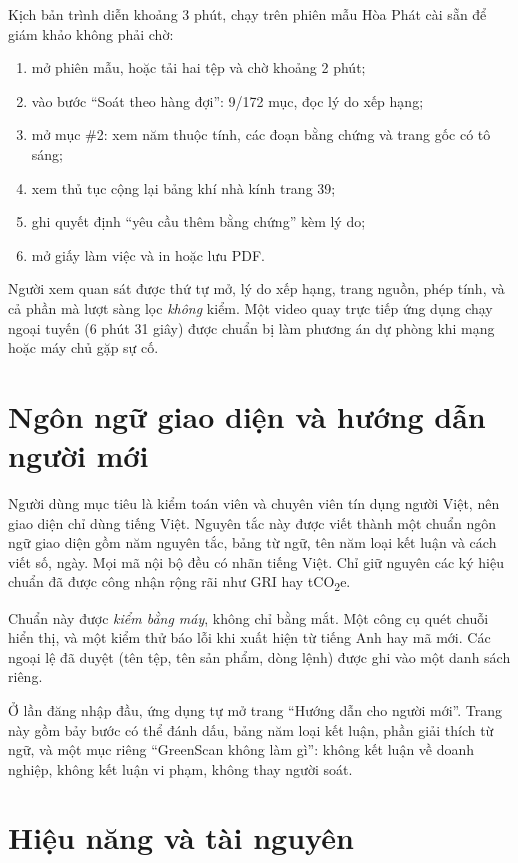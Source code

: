 Kịch bản trình diễn khoảng 3 phút, chạy trên phiên mẫu Hòa Phát cài sẵn để giám khảo không phải chờ:
\begin{enumerate}
\item mở phiên mẫu, hoặc tải hai tệp và chờ khoảng 2 phút;
\item vào bước “Soát theo hàng đợi”: 9/172 mục, đọc lý do xếp hạng;
\item mở mục \#2: xem năm thuộc tính, các đoạn bằng chứng và trang gốc có tô sáng;
\item xem thủ tục cộng lại bảng khí nhà kính trang 39;
\item ghi quyết định “yêu cầu thêm bằng chứng” kèm lý do;
\item mở giấy làm việc và in hoặc lưu PDF.
\end{enumerate}
Người xem quan sát được thứ tự mở, lý do xếp hạng, trang nguồn, phép tính, và cả phần mà lượt sàng lọc \emph{không} kiểm. Một video quay trực tiếp ứng dụng chạy ngoại tuyến (6 phút 31 giây) được chuẩn bị làm phương án dự phòng khi mạng hoặc máy chủ gặp sự cố.

\section{Ngôn ngữ giao diện và hướng dẫn người mới}

Người dùng mục tiêu là kiểm toán viên và chuyên viên tín dụng người Việt, nên giao diện chỉ dùng tiếng Việt. Nguyên tắc này được viết thành một chuẩn ngôn ngữ giao diện gồm năm nguyên tắc, bảng từ ngữ, tên năm loại kết luận và cách viết số, ngày. Mọi mã nội bộ đều có nhãn tiếng Việt. Chỉ giữ nguyên các ký hiệu chuẩn đã được công nhận rộng rãi như GRI hay tCO\textsubscript{2}e.

Chuẩn này được \emph{kiểm bằng máy}, không chỉ bằng mắt. Một công cụ quét chuỗi hiển thị, và một kiểm thử báo lỗi khi xuất hiện từ tiếng Anh hay mã mới. Các ngoại lệ đã duyệt (tên tệp, tên sản phẩm, dòng lệnh) được ghi vào một danh sách riêng.

Ở lần đăng nhập đầu, ứng dụng tự mở trang “Hướng dẫn cho người mới”. Trang này gồm bảy bước có thể đánh dấu, bảng năm loại kết luận, phần giải thích từ ngữ, và một mục riêng “GreenScan không làm gì”: không kết luận về doanh nghiệp, không kết luận vi phạm, không thay người soát.

\section{Hiệu năng và tài nguyên}

